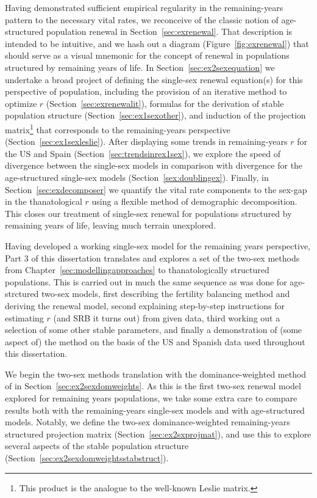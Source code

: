 Having demonstrated sufficient empirical regularity in the remaining-years
pattern to the necessary vital rates, we reconceive of the classic notion of
age-structured population renewal in Section~\ref{sec:exrenewal}. That
description is intended to be intuitive, and we hash out a diagram
(Figure~\ref{fig:exrenewal}) that should serve as a visual mnemonic for the 
concept of renewal in populations structured by remaining years of life. In
Section~\ref{sec:ex2sexequation} we undertake a broad project of defining the
single-sex renewal equation(s) for this perspective of population, including the
provision of an iterative method to optimize $r$
(Section~\ref{sec:exrenewalit}), formulas for the derivation of stable
population structure (Section~\ref{sec:ex1sexother}), and induction of the
projection matrix\footnote{This product is the analogue to the well-known Leslie
matrix.} that corresponds to the remaining-years perspective 
(Section~\ref{sec:ex1sexleslie}). After displaying some trends in
remaining-years $r$ for the US and Spain (Section~\ref{sec:trendsinrex1sex}),
 we explore the speed of divergence between the single-sex models in comparison with divergence for the age-structured
single-sex models (Section~\ref{sex:doublingex}). Finally, in
Section~\ref{sec:exdecomposer} we quantify the vital rate components to the
sex-gap in the thanatological $r$ using a flexible method of demographic
decomposition. This closes our treatment of single-sex renewal for populations
structured by remaining years of life, leaving much terrain unexplored.

Having developed a working single-sex model for the remaining years perspective,
Part 3 of this dissertation translates and explores a set of the two-sex
methods from Chapter~\ref{sec:modellingapproaches} to thanatologically
structured populations. This is carried out in much the same sequence as was
done for age-strctured two-sex models, first describing the fertility
balancing method and deriving the renewal model, second explaining step-by-step
instructions for estimating $r$ (and SRB it turns out) from given data, third
working out a selection of some other stable parameters, and
finally a demonstration of (some aspect of) the method on the basis of the US
and Spanish data used throughout this dissertation.

We begin the two-sex methods translation with the
dominance-weighted method of \citet{goodman1967age} in
Section~\ref{sec:ex2sexdomweights}. As this is the first two-sex renewal model
explored for remaining years populations, we take some extra care to compare
results both with the remaining-years single-sex models and with age-structured models. Notably, we
define the two-sex dominance-weighted remaining-years structured
projection matrix (Section~\ref{sec:ex2sxprojmat}), and use this to explore
several aspects of the stable population structure
(Section~\ref{sec:ex2sexdomweightsstabstruct}). 


